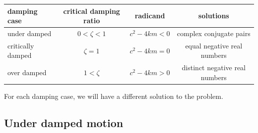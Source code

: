 \documentclass[12pt,a4paper]{article}
\begin{document}
			\begin{table}[h!]
				\centering
				\begin{tabular}{lccc}
					\toprule
					damping case & critical damping ratio & radicand & solutions  \\ \midrule
					under damped &  $0<\zeta<1$ & $c^2-4km<0$ & complex conjugate pairs \\
					critically damped & $\zeta=1$ & $c^2-4km=0$ & equal negative real numbers \\
					over damped & $1<\zeta$  & $c^2-4km>0$ & distinct negative real numbers \\ \bottomrule
				\end{tabular}
			\end{table}
			For each damping case, we will have a different solution to the problem. 
					
		\subsection*{Under damped motion}
		
\end{document}
